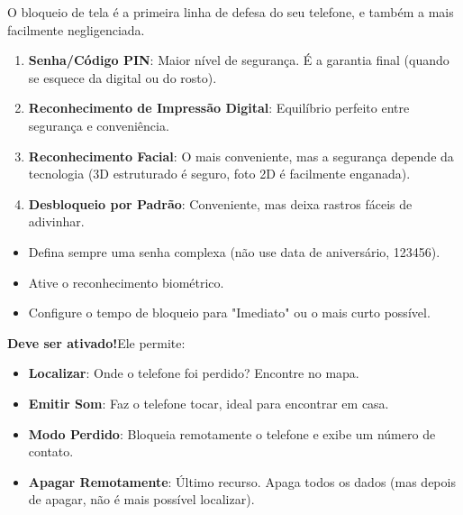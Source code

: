 


O bloqueio de tela é a primeira linha de defesa do seu telefone, e também a mais facilmente negligenciada.


\begin{enumerate}
  \item \textbf{Senha/Código PIN}: Maior nível de segurança. É a garantia final (quando se esquece da digital ou do rosto).
  \item \textbf{Reconhecimento de Impressão Digital}: Equilíbrio perfeito entre segurança e conveniência.
  \item \textbf{Reconhecimento Facial}: O mais conveniente, mas a segurança depende da tecnologia (3D estruturado é seguro, foto 2D é facilmente enganada).
  \item \textbf{Desbloqueio por Padrão}: Conveniente, mas deixa rastros fáceis de adivinhar.
\end{enumerate}


\begin{itemize}
  \item Defina sempre uma senha complexa (não use data de aniversário, 123456).
  \item Ative o reconhecimento biométrico.
  \item Configure o tempo de bloqueio para "Imediato" ou o mais curto possível.
\end{itemize}


\textbf{Deve ser ativado!}Ele permite:

\begin{itemize}
  \item \textbf{Localizar}: Onde o telefone foi perdido? Encontre no mapa.
  \item \textbf{Emitir Som}: Faz o telefone tocar, ideal para encontrar em casa.
  \item \textbf{Modo Perdido}: Bloqueia remotamente o telefone e exibe um número de contato.
  \item \textbf{Apagar Remotamente}: Último recurso. Apaga todos os dados (mas depois de apagar, não é mais possível localizar).
\end{itemize}

